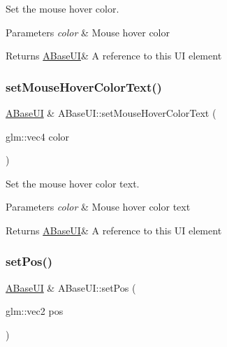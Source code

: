 Set the mouse hover color. 


\begin{DoxyParams}{Parameters}
{\em color} & Mouse hover color \\
\hline
\end{DoxyParams}
\begin{DoxyReturn}{Returns}
\hyperlink{class_a_base_u_i}{A\+Base\+UI}\& A reference to this UI element 
\end{DoxyReturn}
\mbox{\label{class_a_base_u_i_a27891d827140704a50a25f55c4939c03}} 
\subsubsection{\texorpdfstring{set\+Mouse\+Hover\+Color\+Text()}{setMouseHoverColorText()}}
{\footnotesize\ttfamily \hyperlink{class_a_base_u_i}{A\+Base\+UI} \& A\+Base\+U\+I\+::set\+Mouse\+Hover\+Color\+Text (\begin{DoxyParamCaption}\item[{glm\+::vec4}]{color }\end{DoxyParamCaption})\hspace{0.3cm}{\ttfamily [virtual]}}



Set the mouse hover color text. 


\begin{DoxyParams}{Parameters}
{\em color} & Mouse hover color text \\
\hline
\end{DoxyParams}
\begin{DoxyReturn}{Returns}
\hyperlink{class_a_base_u_i}{A\+Base\+UI}\& A reference to this UI element 
\end{DoxyReturn}
\mbox{\label{class_a_base_u_i_a68ad426cc75f6a61fe000c8e92d4df0c}} 
\subsubsection{\texorpdfstring{set\+Pos()}{setPos()}}
{\footnotesize\ttfamily \hyperlink{class_a_base_u_i}{A\+Base\+UI} \& A\+Base\+U\+I\+::set\+Pos (\begin{DoxyParamCaption}\item[{glm\+::vec2}]{pos }\end{DoxyParamCaption})\hspace{0.3cm}{\ttfamily [virtual]}}



